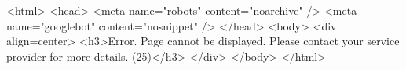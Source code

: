 <html>
<head>
<meta name="robots" content="noarchive" />
<meta name="googlebot" content="nosnippet" />
</head>
<body>
<div align=center>
<h3>Error. Page cannot be displayed. Please contact your service provider for more details.  (25)</h3>
</div>
</body>
</html>